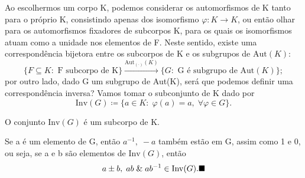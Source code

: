 \documentclass[../algebraIII_notes.tex]{subfiles}
\begin{document}
Ao escolhermos um corpo K, podemos considerar os automorfismos de K tanto para o próprio K, consistindo apenas dos isomorfismo \(\varphi :K\rightarrow K\), ou então olhar para os automorfismos fixadores de subcorpos K, para os quais os isomorfismos atuam como a unidade nos elementos de F. Neste sentido, existe uma correspondência bijetora entre os subcorpos de K e os subgrupos de \(\mathrm{Aut}(K)\):
\[
	\{F\subseteq K: \text{ F subcorpo de K}\} \stackrel{\mathrm{Aut}_{(\cdot )}(K)}\longrightarrow \{G: \text{ G é subgrupo de }\mathrm{Aut}(K)\};
\]
por outro lado, dado G um subgrupo de Aut(K), será que podemos definir uma correspondência inversa? Vamos tomar o subconjunto de K dado por
\[
	\mathrm{Inv}(G)\coloneqq \{a\in K:\; \varphi (a) = a,\; \forall \varphi \in G\}.
\]

\begin{lemma*}
	O conjunto \(\mathrm{Inv}(G)\) é um subcorpo de K.
\end{lemma*}
\begin{proof*}
	Se a é um elemento de G, então \(a^{-1},\; -a\) também estão em G, assim como 1 e 0, ou seja, se a e b são elementos de \(\mathrm{Inv}(G)\), então
	\[
		a\pm b,\; ab \;\&\; ab^{-1}\in \mathrm{Inv}(G). \text{$\blacksquare$}
	\]
\end{proof*}
\end{document}
